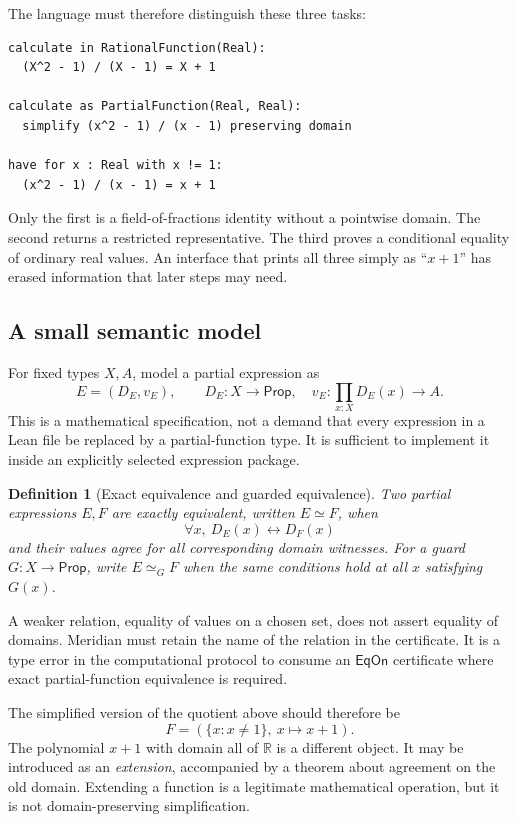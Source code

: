 \documentclass[11pt,a4paper]{article}
\newcommand{\R}{\mathbb R}
\newcommand{\EqOn}{\mathsf{EqOn}}
\newtheorem{definition}[proposition]{Definition}
\theoremstyle{remark}
\begin{document}
The language must therefore distinguish these three tasks:
\par\smallskip\noindent\begin{minipage}{\linewidth}
\begin{lstlisting}
calculate in RationalFunction(Real):
  (X^2 - 1) / (X - 1) = X + 1

calculate as PartialFunction(Real, Real):
  simplify (x^2 - 1) / (x - 1) preserving domain

have for x : Real with x != 1:
  (x^2 - 1) / (x - 1) = x + 1
\end{lstlisting}
\end{minipage}\par\smallskip
Only the first is a field-of-fractions identity without a pointwise domain.
The second returns a restricted representative. The third proves a conditional
equality of ordinary real values. An interface that prints all three simply as
``$x+1$'' has erased information that later steps may need.

\subsection{A small semantic model}
For fixed types $X,A$, model a partial expression as
\[
 E=(D_E,v_E),\qquad
 D_E:X\to\mathsf{Prop},\quad
 v_E:\prod_{x:X}D_E(x)\to A.
\]
This is a mathematical specification, not a demand that every expression in a
Lean file be replaced by a partial-function type. It is sufficient to implement
it inside an explicitly selected expression package.

\begin{definition}[Exact equivalence and guarded equivalence]
Two partial expressions $E,F$ are exactly equivalent, written $E\simeq F$, when
\[
 \forall x,\ D_E(x)\leftrightarrow D_F(x)
\]
and their values agree for all corresponding domain witnesses. For a guard
$G:X\to\mathsf{Prop}$, write $E\simeq_G F$ when the same conditions hold at
all $x$ satisfying $G(x)$.
\end{definition}

A weaker relation, equality of values on a chosen set, does not assert equality
of domains. Meridian must retain the name of the relation in the certificate.
It is a type error in the computational protocol to consume an
$\EqOn$ certificate where exact partial-function equivalence is required.

The simplified version of the quotient above should therefore be
\[
 F=(\{x:x\ne1\},\ x\mapsto x+1).
\]
The polynomial $x+1$ with domain all of $\R$ is a different object. It may be
introduced as an \emph{extension}, accompanied by a theorem about agreement on
the old domain. Extending a function is a legitimate mathematical operation,
but it is not domain-preserving simplification.
\end{document}
